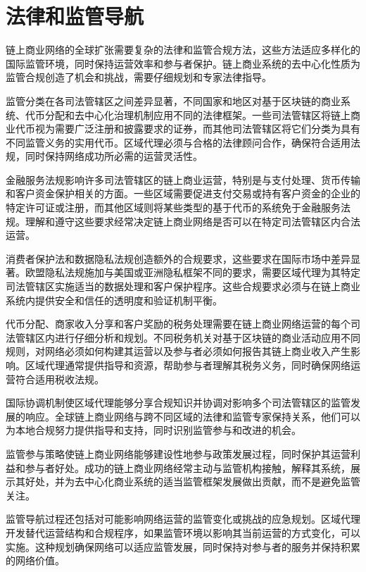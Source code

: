 \documentclass[
  Letterpaper,
]{scrbook}
\begin{document}
\section{法律和监管导航}\label{ux6cd5ux5f8bux548cux76d1ux7ba1ux5bfcux822a}

链上商业网络的全球扩张需要复杂的法律和监管合规方法，这些方法适应多样化的国际监管环境，同时保持运营效率和参与者保护。链上商业系统的去中心化性质为监管合规创造了机会和挑战，需要仔细规划和专家法律指导。

监管分类在各司法管辖区之间差异显著，不同国家和地区对基于区块链的商业系统、代币分配和去中心化治理机制应用不同的法律框架。一些司法管辖区将链上商业代币视为需要广泛注册和披露要求的证券，而其他司法管辖区将它们分类为具有不同监管义务的实用代币。区域代理必须与合格的法律顾问合作，确保符合适用法规，同时保持网络成功所必需的运营灵活性。

金融服务法规影响许多司法管辖区的链上商业运营，特别是与支付处理、货币传输和客户资金保护相关的方面。一些区域需要促进支付交易或持有客户资金的企业的特定许可证或注册，而其他区域则将某些类型的基于代币的系统免于金融服务法规。理解和遵守这些要求经常决定链上商业网络是否可以在特定司法管辖区内合法运营。

消费者保护法和数据隐私法规创造额外的合规要求，这些要求在国际市场中差异显著。欧盟隐私法规施加与美国或亚洲隐私框架不同的要求，需要区域代理为其特定司法管辖区实施适当的数据处理和客户保护程序。这些合规要求必须与在链上商业系统内提供安全和信任的透明度和验证机制平衡。

代币分配、商家收入分享和客户奖励的税务处理需要在链上商业网络运营的每个司法管辖区内进行仔细分析和规划。不同税务机关对基于区块链的商业活动应用不同规则，对网络必须如何构建其运营以及参与者必须如何报告其链上商业收入产生影响。区域代理通常提供指导和资源，帮助参与者理解其税务义务，同时确保网络运营符合适用税收法规。

国际协调机制使区域代理能够分享合规知识并协调对影响多个司法管辖区的监管发展的响应。全球链上商业网络与跨不同区域的法律和监管专家保持关系，他们可以为本地合规努力提供指导和支持，同时识别监管参与和改进的机会。

监管参与策略使链上商业网络能够建设性地参与政策发展过程，同时保护其运营利益和参与者好处。成功的链上商业网络经常主动与监管机构接触，解释其系统，展示其好处，并为去中心化商业系统的适当监管框架发展做出贡献，而不是避免监管关注。

监管导航过程还包括对可能影响网络运营的监管变化或挑战的应急规划。区域代理开发替代运营结构和合规程序，如果监管环境以影响其当前运营的方式变化，可以实施。这种规划确保网络可以适应监管发展，同时保持对参与者的服务并保持积累的网络价值。
\end{document}
